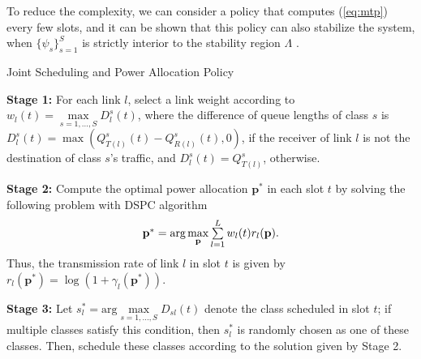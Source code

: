 \documentclass[10pt,journal,letterpaper,compsoc]{IEEEtran}
\begin{document}
{{To reduce the complexity, we can consider a policy that computes (\ref{eq:mtp}) every few slots, and it can be shown that this policy can also stabilize the system, when $\{\psi_s\}_{s=1}^S$ is strictly interior to the stability region $\Lambda$ \cite{sarkar:2008,zhang:2009}.


\begin{algorithm}
\caption{Joint Scheduling and Power Allocation Policy}
\label{alg:mtp}
\begin{algorithmic}
\STATE \textbf{Stage 1:} For each link $l$, select a link weight according to $w_l(t)=\max\limits_{s=1,...,S}D_{l}^s(t)$, where the difference of queue lengths of class $s$ is $D_{l}^s(t)=\max(Q_{T(l)}^s(t)-Q_{R(l)}^s(t),0)$, if the receiver of link $l$ is not the destination of class $s$'s traffic, and  $D_{l}^s(t)=Q_{T(l)}^s$, otherwise.

\STATE \textbf{Stage 2:} Compute the optimal power allocation $\mathbf{p}^*$ in each slot $t$ by solving the following problem with DSPC algorithm
\begin{equation}\begin{array}
[c]{lll}\mathbf{p}^*=\text{arg}\max\limits_{\mathbf{p}} \sum\limits_{l=1}^L w_l(t)r_l(\mathbf{p}).
\end{array}
\label{eq:mtp}
\end{equation}
Thus, the transmission rate of link $l$ in slot $t$ is given by $r_l(\mathbf{p}^*)=\log(1+\gamma_l(\mathbf{p}^*))$.

\STATE \textbf{Stage 3:} Let $s_l^*=\text{arg}\max\limits_{s=1,...,S}D_{sl}(t)$ denote the class scheduled in slot $t$; if multiple classes satisfy this condition, then $s_l^*$ is randomly chosen as one of these classes. Then, schedule these classes according to the solution given by Stage 2.
\end{algorithmic}
\end{algorithm}

}}
\end{document}

